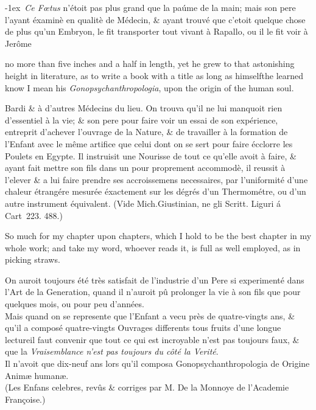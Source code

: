 \documentclass{article}
\begin{document}
\vfill
\bgroup\fontsize{8}{10}\selectfont
\indent\lower-1ex\hbox{\ast}\ \textit{Ce Fœtus} n’étoit pas plus
grand que la paúme de la main; mais son pere l’ayant éxaminè
en qua\-litè de Médecin, \& ayant trouvé que c’etoit quelque
chose de plus qu’un Embryon, le fit transporter tout vivant
à Rapallo, ou il le fit voir à Jerôme\parfillskip=0pt\par\egroup

\newpage\noindent
no more than five inches and a half in length, yet he grew
to that astonishing height in literature, as to write a book
with a title as long as himself\tsk the learned know I mean
his \textit{Gono\-psych\-an\-thropo\-logia}, upon the origin
of the human soul.


\vfill
\bgroup\fontsize{8}{10}\selectfont
\noindent
Bardi \& à d’autres
Médecins du lieu.  On trouva qu’il ne lui manquoit rien
d’essentiel à la vie; \& son pere pour faire voir un essai
de son expérience, entreprit d’achever l’ouvrage de la
Nature, \& de travailler à la formation de l’Enfant avec le
même artifice que celui dont on se sert pour faire écclorre
les Poulets en Egypte. Il instruisit une Nourisse de tout ce
qu’elle avoit à faire, \& ayant fait mettre son fils dans un
pour proprement accommodè, il reussit à l’elever \& a lui
faire prendre ses accroissemens necessaires, par
l’uniformité d’une chaleur étrangére mesurée éxactement sur
les dégrés d’un Thermométre, ou d’un autre instrument
équivalent. (Vide Mich.\@  Giustinian, ne gli Scritt.\@
Liguri á
Cart~223. 488.)\par\egroup
\newpage
So much for my chapter upon chapters, which I hold
to be the best chapter in my whole work; and take my word, whoever
reads it, is full as well employed, as in picking straws.


\vfill
\bgroup\fontsize{8}{10}\selectfont
On auroit toujours été très satisfait de l’industrie d’un Pere si
experimenté dans l’Art de la Generation, quand il n’auroit pû
prolonger la vie à son fils que pour quelques mois, ou pour peu
d’années.\\
\indent
Mais quand on se represente que l’Enfant a vecu près de quatre-vingts
ans, \& qu’il a composé quatre-vingts Ouvrages differents tous fruits
d’une longue lecture\tsk il faut convenir que tout ce qui est
incroyable n’est pas toujours faux, \& que la \textit{Vraisemblance
n’est pas toujours du côté la Verité}.\\
\indent
Il n’avoit que dix-neuf ans lors qu’il composa
Gonopsychanthropologia de Origine Animæ humanæ.\\
\indent
(Les Enfans celebres, revûs \& corriges par M. De la Monnoye de
l’Academie Françoise.)\par\egroup
\end{document}
